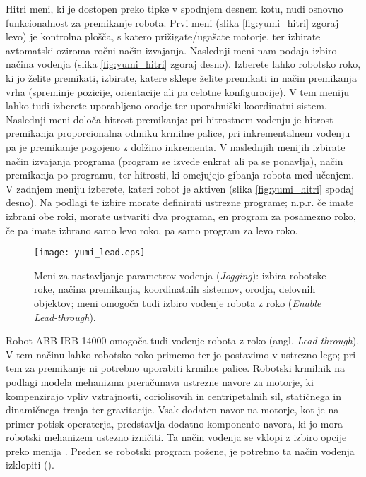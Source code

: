 Hitri meni, ki je dostopen preko tipke v spodnjem desnem kotu, nudi osnovno funkcionalnost za premikanje robota. Prvi meni (slika \ref{fig:yumi_hitri} zgoraj levo) je kontrolna plošča, s katero prižigate/ugašate motorje, ter izbirate avtomatski oziroma ročni način izvajanja. Naslednji meni nam podaja izbiro načina vodenja (slika \ref{fig:yumi_hitri} zgoraj desno). Izberete lahko robotsko roko, ki jo želite premikati, izbirate, katere sklepe želite premikati in način premikanja vrha (spreminje pozicije, orientacije ali pa celotne konfiguracije). V tem meniju lahko tudi izberete uporabljeno orodje ter uporabniški koordinatni sistem. Naslednji meni določa hitrost premikanja: pri hitrostnem vodenju je hitrost premikanja proporcionalna odmiku krmilne palice, pri inkrementalnem vodenju pa je premikanje pogojeno z dolžino inkrementa. V naslednjih menijih izbirate način izvajanja programa (program se izvede enkrat ali pa se ponavlja), način premikanja po programu, ter hitrosti, ki omejujejo gibanja robota med učenjem. V zadnjem meniju izberete, kateri robot je aktiven (slika \ref{fig:yumi_hitri} spodaj desno). Na podlagi te izbire morate definirati ustrezne programe; n.p.r. če imate izbrani obe roki, morate ustvariti dva programa, en program za posamezno roko, če pa imate izbrano samo levo roko, pa samo program za levo roko.


\begin{figure}[!hbt]
\centering
\texttt{[image: yumi\_lead.eps]}
\caption{Meni za nastavljanje parametrov vodenja (\emph{Jogging}): izbira robotske roke, načina premikanja, koordinatnih sistemov, orodja, delovnih objektov; meni omogoča tudi izbiro vodenje robota z roko (\emph{Enable Lead-through}).}
\label{fig:yumi_smart_meni}
\end{figure}

Robot ABB IRB 14000 omogoča tudi vodenje robota z roko (angl. \emph{Lead through}). V tem načinu lahko robotsko roko primemo ter jo postavimo v ustrezno lego; pri tem za premikanje ni potrebno uporabiti krmilne palice. Robotski krmilnik na podlagi modela mehanizma preračunava ustrezne navore za motorje, ki kompenzirajo vpliv vztrajnosti, coriolisovih in centripetalnih sil, statičnega in dinamičnega trenja ter gravitacije. Vsak dodaten navor na motorje, kot je na primer potisk operaterja, predstavlja dodatno komponento navora, ki jo mora robotski mehanizem ustezno izničiti. Ta način vodenja se vklopi z izbiro opcije  preko menija . Preden se robotski program požene, je potrebno ta način vodenja izklopiti ().





